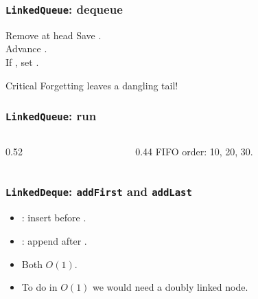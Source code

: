 \documentclass[aspectratio=169,10pt,compress]{beamer}
\begin{document}
\begin{frame}[t,fragile]\frametitle{\texttt{LinkedQueue}: dequeue}
      \begin{block}{Remove at head}
        \small
        Save .\\
        Advance .\\
        If , set .
      \end{block}
      \begin{block}{Critical}
        \small
        Forgetting  leaves a dangling tail!
      \end{block}
\end{frame}

\begin{frame}[t,fragile]\frametitle{\texttt{LinkedQueue}: run}
  \begin{columns}[T]
    \begin{column}{0.52\textwidth}
    \end{column}
    \begin{column}{0.44\textwidth}
      \small
      FIFO order: 10, 20, 30.
    \end{column}
  \end{columns}
\end{frame}

\begin{frame}[t,fragile]\frametitle{\texttt{LinkedDeque}: \texttt{addFirst} and \texttt{addLast}}
      \begin{itemize}\small
        \item {}: insert before .
        \item {}: append after .
        \item Both $O(1)$.
        \item To do  in $O(1)$ we would need
              a doubly linked node.
      \end{itemize}
\end{frame}
\end{document}
